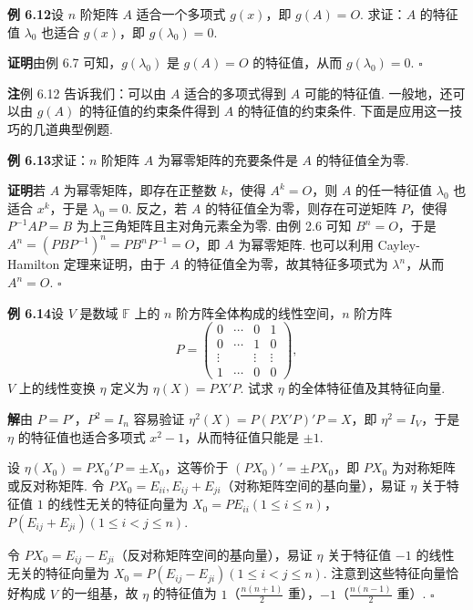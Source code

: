 \documentclass[UTF8,12pt,a4paper,fontset=fandol]{ctexart}
\begin{document}
\noindent\textbf{例 6.12}\quad 设 $n$ 阶矩阵 $A$ 适合一个多项式 $g(x)$，即 $g(A)=O$. 求证：$A$ 的特征值 $\lambda_0$ 也适合 $g(x)$，即 $g(\lambda_0)=0$.

\noindent\textbf{证明}\quad 由例 6.7 可知，$g(\lambda_0)$ 是 $g(A)=O$ 的特征值，从而 $g(\lambda_0)=0$. $\square$

\noindent\textbf{注}\quad 例 6.12 告诉我们：可以由 $A$ 适合的多项式得到 $A$ 可能的特征值. 一般地，还可以由 $g(A)$ 的特征值的约束条件得到 $A$ 的特征值的约束条件. 下面是应用这一技巧的几道典型例题.

\noindent\textbf{例 6.13}\quad 求证：$n$ 阶矩阵 $A$ 为幂零矩阵的充要条件是 $A$ 的特征值全为零.

\noindent\textbf{证明}\quad 若 $A$ 为幂零矩阵，即存在正整数 $k$，使得 $A^k=O$，则 $A$ 的任一特征值 $\lambda_0$ 也适合 $x^k$，于是 $\lambda_0=0$. 反之，若 $A$ 的特征值全为零，则存在可逆矩阵 $P$，使得 $P^{-1}AP=B$ 为上三角矩阵且主对角元素全为零. 由例 2.6 可知 $B^n=O$，于是 $A^n=(PBP^{-1})^n=PB^nP^{-1}=O$，即 $A$ 为幂零矩阵. 也可以利用 Cayley-Hamilton 定理来证明，由于 $A$ 的特征值全为零，故其特征多项式为 $\lambda^n$，从而 $A^n=O$. $\square$

\noindent\textbf{例 6.14}\quad 设 $V$ 是数域 $\mathbb{F}$ 上的 $n$ 阶方阵全体构成的线性空间，$n$ 阶方阵
\[
P=\left(\begin{array}{cccc}
0 & \cdots & 0 & 1\\
0 & \cdots & 1 & 0\\
\vdots & & \vdots & \vdots\\
1 & \cdots & 0 & 0
\end{array}\right),
\]
$V$ 上的线性变换 $\eta$ 定义为 $\eta(X)=PX'P$. 试求 $\eta$ 的全体特征值及其特征向量.

\noindent\textbf{解}\quad 由 $P=P'$，$P^2=I_n$ 容易验证 $\eta^2(X)=P(PX'P)'P=X$，即 $\eta^2=I_V$，于是 $\eta$ 的特征值也适合多项式 $x^2-1$，从而特征值只能是 $\pm 1$.

设 $\eta(X_0)=PX_0'P=\pm X_0$，这等价于 $(PX_0)'=\pm PX_0$，即 $PX_0$ 为对称矩阵或反对称矩阵. 令 $PX_0=E_{ii},E_{ij}+E_{ji}$（对称矩阵空间的基向量），易证 $\eta$ 关于特征值 $1$ 的线性无关的特征向量为 $X_0=PE_{ii}(1\le i\le n)$，$P(E_{ij}+E_{ji})(1\le i<j\le n)$.

令 $PX_0=E_{ij}-E_{ji}$（反对称矩阵空间的基向量），易证 $\eta$ 关于特征值 $-1$ 的线性无关的特征向量为 $X_0=P(E_{ij}-E_{ji})(1\le i<j\le n)$. 注意到这些特征向量恰好构成 $V$ 的一组基，故 $\eta$ 的特征值为 $1$（$\frac{n(n+1)}{2}$ 重），$-1$（$\frac{n(n-1)}{2}$ 重）. $\square$
\end{document}
